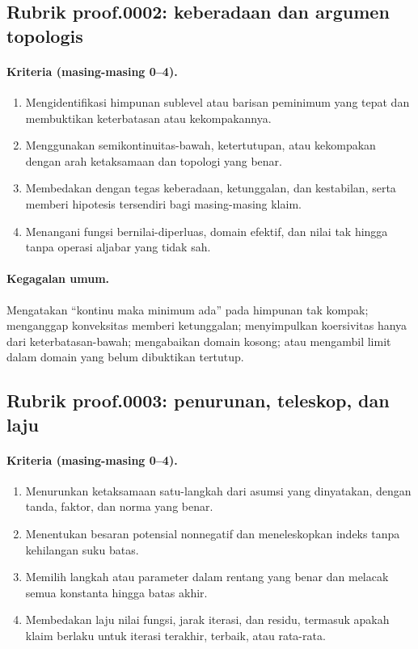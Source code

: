 \subsection{Rubrik proof.0002: keberadaan dan argumen topologis}
\label{orig03:rubric:proof:0002}

\paragraph{Kriteria (masing-masing 0--4).}
\begin{enumerate}
  \item Mengidentifikasi himpunan sublevel atau barisan peminimum yang tepat
  dan membuktikan keterbatasan atau kekompakannya.
  \item Menggunakan semikontinuitas-bawah, ketertutupan, atau kekompakan dengan
  arah ketaksamaan dan topologi yang benar.
  \item Membedakan dengan tegas keberadaan, ketunggalan, dan kestabilan, serta
  memberi hipotesis tersendiri bagi masing-masing klaim.
  \item Menangani fungsi bernilai-diperluas, domain efektif, dan nilai tak
  hingga tanpa operasi aljabar yang tidak sah.
\end{enumerate}

\paragraph{Kegagalan umum.}
Mengatakan ``kontinu maka minimum ada'' pada himpunan tak kompak; menganggap
konveksitas memberi ketunggalan; menyimpulkan koersivitas hanya dari
keterbatasan-bawah; mengabaikan domain kosong; atau mengambil limit dalam
domain yang belum dibuktikan tertutup.

\subsection{Rubrik proof.0003: penurunan, teleskop, dan laju}
\label{orig03:rubric:proof:0003}

\paragraph{Kriteria (masing-masing 0--4).}
\begin{enumerate}
  \item Menurunkan ketaksamaan satu-langkah dari asumsi yang dinyatakan, dengan
  tanda, faktor, dan norma yang benar.
  \item Menentukan besaran potensial nonnegatif dan meneleskopkan indeks tanpa
  kehilangan suku batas.
  \item Memilih langkah atau parameter dalam rentang yang benar dan melacak
  semua konstanta hingga batas akhir.
  \item Membedakan laju nilai fungsi, jarak iterasi, dan residu, termasuk apakah
  klaim berlaku untuk iterasi terakhir, terbaik, atau rata-rata.
\end{enumerate}

